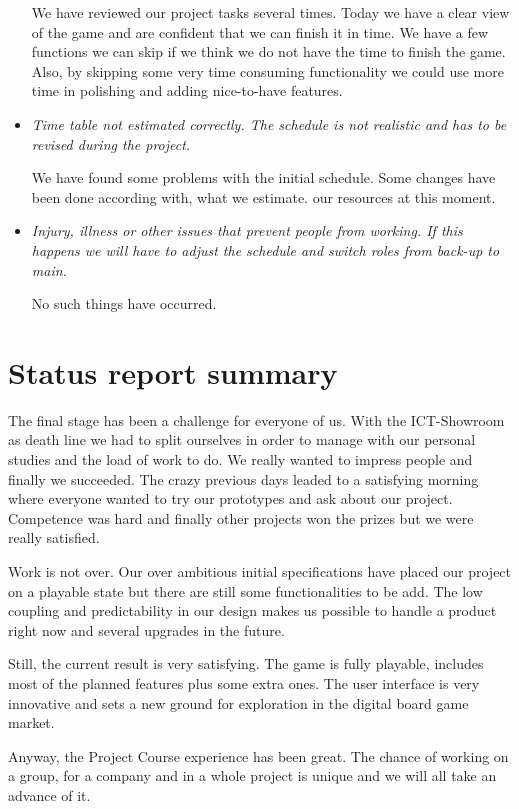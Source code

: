 \documentclass[12pt,a4paper]{article}
\begin{document}
\begin{itemize}
We have reviewed our project tasks several times. Today we have a
clear view of the game and are confident that we can finish it in
time. We have a few functions we can skip if we think we do not have
the time to finish the game. Also, by skipping some very time
consuming functionality we could use more time in polishing and adding
nice-to-have features.

\item \textit{Time table not estimated correctly. The schedule is not realistic and has to be revised during the project.}

We have found some problems with the initial schedule. Some changes have been done according with, what we estimate. our resources at this moment.

\item \textit{Injury, illness or other issues that prevent people from working. If this happens we will have to adjust the schedule and switch roles from back-up to main.}

No such things have occurred.
\end{itemize}

\section{Status report summary}

The final stage has been a challenge for everyone of us. With the ICT-Showroom as death line we had to split ourselves in order to manage with our personal studies and the load of work to do. We really wanted to impress people and finally we succeeded. The crazy previous days leaded to a satisfying morning where everyone wanted to try our prototypes and ask about our project. Competence was hard and finally other projects won the prizes but we were really satisfied.

Work is not over. Our over ambitious initial specifications have
placed our project on a playable state but there are still some
functionalities to be add. The low coupling and predictability in our
design makes us possible to handle a product right now and several
upgrades in the future.

Still, the current result is very satisfying. The game is fully
playable, includes most of the planned features plus some extra
ones. The user interface is very innovative and sets a new ground for
exploration in the digital board game market.

Anyway, the Project Course experience has been great. The chance of
working on a group, for a company and in a whole project is unique and
we will all take an advance of it.
\end{document}
